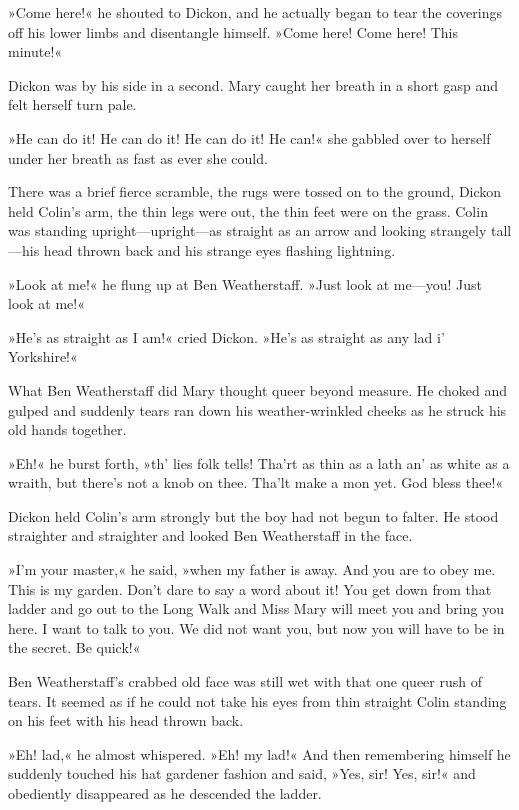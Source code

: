 »Come here!« he shouted to Dickon, and he actually began to tear the coverings off his lower limbs and disentangle himself. »Come here! Come here! This minute!«

Dickon was by his side in a second. Mary caught her breath in a short gasp and felt herself turn pale.

»He can do it! He can do it! He can do it! He can!« she gabbled over to herself under her breath as fast as ever she could.

There was a brief fierce scramble, the rugs were tossed on to the ground, Dickon held Colin's arm, the thin legs were out, the thin feet were on the grass. Colin was standing upright—upright—as straight as an arrow and looking strangely tall—his head thrown back and his strange eyes flashing lightning.

»Look at me!« he flung up at Ben Weatherstaff. »Just look at me—you! Just look at me!«

»He's as straight as I am!« cried Dickon. »He's as straight as any lad i' Yorkshire!«

What Ben Weatherstaff did Mary thought queer beyond measure. He choked and gulped and suddenly tears ran down his weather-wrinkled cheeks as he struck his old hands together.

»Eh!« he burst forth, »th' lies folk tells! Tha'rt as thin as a lath an' as white as a wraith, but there's not a knob on thee. Tha'lt make a mon yet. God bless thee!«

Dickon held Colin's arm strongly but the boy had not begun to falter. He stood straighter and straighter and looked Ben Weatherstaff in the face.

»I'm your master,« he said, »when my father is away. And you are to obey me. This is my garden. Don't dare to say a word about it! You get down from that ladder and go out to the Long Walk and Miss Mary will meet you and bring you here. I want to talk to you. We did not want you, but now you will have to be in the secret. Be quick!«

Ben Weatherstaff's crabbed old face was still wet with that one queer rush of tears. It seemed as if he could not take his eyes from thin straight Colin standing on his feet with his head thrown back.

»Eh! lad,« he almost whispered. »Eh! my lad!« And then remembering himself he suddenly touched his hat gardener fashion and said, »Yes, sir! Yes, sir!« and obediently disappeared as he descended the ladder.

